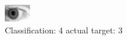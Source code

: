 \begin{figure}[h!]
\begin{center}
\includegraphics[width=0.60\columnwidth]{figures/ID234_class_4_target_3.png}
\end{center}
\caption{ Classification: 4 actual target: 3}
\label{fig:ID234_class_4_target_3}
\end{figure}
